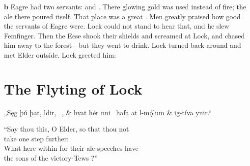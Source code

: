 \textbf{b} Eagre had two servants:  and . There glowing gold was used instead of fire; the ale there poured itself. That place was a great . Men greatly praised how good the servants of Eagre were. Lock could not stand to hear that, and he slew Femfinger. Then the Eese shook their shields and screamed at Lock, and chased him away to the forest—but they went to drink. Lock turned back around and met Elder outside. Lock greeted him:\epb\epg

\sectionline

\section{The Flyting of Lock}

\bvg\bva „Sęg þú þat, ldir, \hld\ , &
hvat hér nni \hld\ hafa at l-mǫ́lum &
\ind {}ig-tíva ynir.“\eva

\bvb “Say thou this, O Elder, so that thou not \\
take one step further: \\
What here within for their ale-speeches have \\
the sons of the victory-Tews ?”\evb\evg


